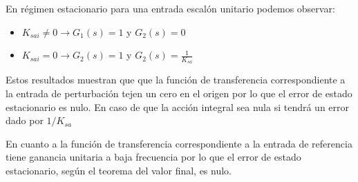 \documentclass{article}
\begin{document}
En régimen estacionario para una entrada escalón unitario podemos observar:

\begin{itemize}
    \item $K_{sai} \neq 0 \to G_1(s) = 1 $ y $G_2(s) = 0$
    \item $K_{sai} = 0 \to G_2(s) = 1 $ y $G_2(s) = \frac{1}{K_{sa}} $
\end{itemize}

Estos resultados muestran que que la función de transferencia
correspondiente a la entrada de perturbación tejen un cero en el origen por lo que el error de estado 
estacionario es nulo. En caso de que la acción integral sea nula si tendrá un error dado por $1/K_{sa}$

En cuanto a la función de transferencia correspondiente a la entrada de referencia tiene ganancia
unitaria a baja frecuencia por lo que el error de estado estacionario, según el teorema del valor final, 
es nulo. 
\end{document}
